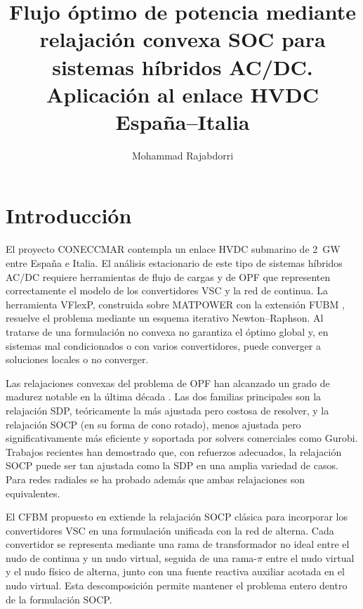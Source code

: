 \documentclass[12pt,a4paper]{iit-project-draft-report}
\title{Flujo óptimo de potencia mediante relajación convexa SOC para sistemas híbridos AC/DC. Aplicación al enlace HVDC España--Italia}
\author{Mohammad Rajabdorri}
\begin{document}
\maketitle

\noindent \hrulefill

\tableofcontents\thispagestyle{fancy}

\noindent \hrulefill

\glsresetall

\newpage
\section{Introducción}

El proyecto CONECCMAR contempla un enlace \gls{HVDC} submarino de \SI{2}{GW}
entre España e Italia. El análisis estacionario de este tipo de sistemas
híbridos AC/DC requiere herramientas de flujo de cargas y de \gls{OPF} que
representen correctamente el modelo de los convertidores \gls{VSC} y la red
de continua. La herramienta \gls{VFlexP}, construida sobre \gls{MATPOWER}
con la extensión \gls{FUBM} \cite{AlvarezBustos2021}, resuelve el problema
mediante un esquema iterativo Newton--Raphson. Al tratarse de una
formulación no convexa no garantiza el óptimo global y, en sistemas mal
condicionados o con varios convertidores, puede converger a soluciones
locales o no converger.

Las relajaciones convexas del problema de \gls{OPF} han alcanzado un grado
de madurez notable en la última década
\cite{MolzahnHiskens2019,Low2014a,Low2014b}. Las dos familias principales
son la relajación \gls{SDP}, teóricamente la más ajustada pero costosa de
resolver, y la relajación \gls{SOCP} (en su forma de cono rotado), menos
ajustada pero significativamente más eficiente y soportada por solvers
comerciales como Gurobi. Trabajos recientes \cite{KocukDeySun2016} han
demostrado que, con refuerzos adecuados, la relajación \gls{SOCP} puede
ser tan ajustada como la \gls{SDP} en una amplia variedad de casos. Para
redes radiales se ha probado además que ambas relajaciones son
equivalentes.

El \gls{CFBM} propuesto en \cite{HigueraGutierrez2025} extiende la
relajación \gls{SOCP} clásica para incorporar los convertidores \gls{VSC}
en una formulación unificada con la red de alterna. Cada convertidor se
representa mediante una rama de transformador no ideal entre el nudo de
continua y un nudo virtual, seguida de una rama-$\pi$ entre el nudo
virtual y el nudo físico de alterna, junto con una fuente reactiva
auxiliar acotada en el nudo virtual. Esta descomposición permite mantener
el problema entero dentro de la formulación \gls{SOCP}.
\end{document}
